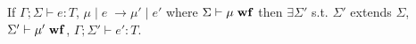 \documentclass{llncs}
\begin{document}
\begin{theorem}[Preservation]
If $\Gamma; \Sigma \vdash e : T$, 
   	$\mu \; | \; e \; \rightarrow \mu' \; | \; e'$ where
	$\Sigma \vdash \mu \; \tt{\bf{wf}}$ then 
 	$\exists \Sigma'$ s.t. 
	$\Sigma'$ extends $\Sigma$, 
	$\Sigma' \vdash \mu' \; \tt{\bf{wf}}$, 
	$\Gamma; \Sigma' \vdash e' : T$.
\end{theorem}
\end{document}
